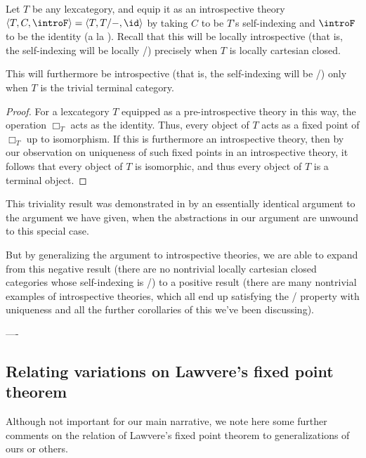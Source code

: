 \begin{theorem}\label{LocallyCartesianLoeb}
Let $T$ be any lexcategory, and equip it as an introspective theory $\langle T, C, \introF \rangle = \langle T, T/-, \id \rangle$ by taking $C$ to be $T$'s self-indexing and $\introF$ to be the identity (a la ). Recall that this will be locally introspective (that is, the self-indexing will be locally \repsmall/) precisely when $T$ is locally cartesian closed.

This will furthermore be introspective (that is, the self-indexing will be \repsmall/) only when $T$ is the trivial terminal category.
\end{theorem}
\begin{proof}
For a lexcategory $T$ equipped as a pre-introspective theory in this way, the operation $\Box_T$ acts as the identity. Thus, every object of $T$ acts as a fixed point of $\Box_T$ up to isomorphism. If this is furthermore an introspective theory, then by our observation on uniqueness of such fixed points in an introspective theory, it follows that every object of $T$ is isomorphic, and thus every object of $T$ is a terminal object.
\end{proof}
This triviality result was demonstrated in \autocite{PittsTaylor1989} by an essentially identical argument to the argument we have given, when the abstractions in our argument are unwound to this special case.

But by generalizing the argument to introspective theories, we are able to expand from this negative result (there are no nontrivial locally cartesian closed categories whose self-indexing is \repsmall/) to a positive result (there are many nontrivial examples of introspective theories, which all end up satisfying the \Loeb/ property with uniqueness and all the further corollaries of this we've been discussing).

----


\subsection{Relating variations on Lawvere's fixed point theorem}\label{LawvereFPTReduxSection}
Although not important for our main narrative, we note here some further comments on the relation of Lawvere's fixed point theorem to generalizations of ours or others.

